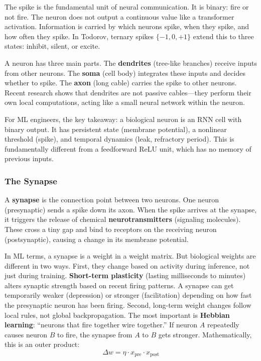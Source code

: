 \documentclass[11pt,a4paper]{article}
\begin{document}
The spike is the fundamental unit of neural communication. It is binary: fire or not fire. The neuron does not output a continuous value like a transformer activation. Information is carried by which neurons spike, when they spike, and how often they spike. In Todorov, ternary spikes $\{-1, 0, +1\}$ extend this to three states: inhibit, silent, or excite.

A neuron has three main parts. The \textbf{dendrites} (tree-like branches) receive inputs from other neurons. The \textbf{soma} (cell body) integrates these inputs and decides whether to spike. The \textbf{axon} (long cable) carries the spike to other neurons. Recent research shows that dendrites are not passive cables---they perform their own local computations, acting like a small neural network within the neuron.

For ML engineers, the key takeaway: a biological neuron is an RNN cell with binary output. It has persistent state (membrane potential), a nonlinear threshold (spike), and temporal dynamics (leak, refractory period). This is fundamentally different from a feedforward ReLU unit, which has no memory of previous inputs.

\subsubsection{The Synapse}

A \textbf{synapse} is the connection point between two neurons. One neuron (presynaptic) sends a spike down its axon. When the spike arrives at the synapse, it triggers the release of chemical \textbf{neurotransmitters} (signaling molecules). These cross a tiny gap and bind to receptors on the receiving neuron (postsynaptic), causing a change in its membrane potential.

In ML terms, a synapse is a weight in a weight matrix. But biological weights are different in two ways. First, they change based on activity during inference, not just during training. \textbf{Short-term plasticity} (lasting milliseconds to minutes) alters synaptic strength based on recent firing patterns. A synapse can get temporarily weaker (depression) or stronger (facilitation) depending on how fast the presynaptic neuron has been firing. Second, long-term weight changes follow local rules, not global backpropagation. The most important is \textbf{Hebbian learning}: ``neurons that fire together wire together.'' If neuron $A$ repeatedly causes neuron $B$ to fire, the synapse from $A$ to $B$ gets stronger. Mathematically, this is an outer product:
\[
  \Delta w = \eta \cdot x_{\mathrm{pre}} \cdot x_{\mathrm{post}}
\]
\end{document}
